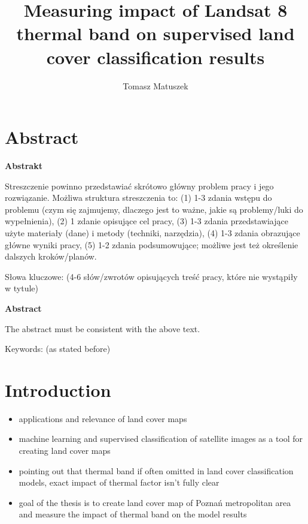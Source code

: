 \documentclass{amuthesis}
\author{Tomasz Matuszek}
\title{Measuring impact of Landsat 8 thermal band on supervised land
cover classification results}
\begin{document}

\titlepage


\hypertarget{abstract}{%
\chapter*{Abstract}\label{abstract}}

\textbf{Abstrakt}

Streszczenie powinno przedstawiać skrótowo główny problem pracy i jego
rozwiązanie. Możliwa struktura streszczenia to: (1) 1-3 zdania wstępu do
problemu (czym się zajmujemy, dlaczego jest to ważne, jakie są
problemy/luki do wypełnienia), (2) 1 zdanie opisujące cel pracy, (3) 1-3
zdania przedstawiające użyte materiały (dane) i metody (techniki,
narzędzia), (4) 1-3 zdania obrazujące główne wyniki pracy, (5) 1-2
zdania podsumowujące; możliwe jest też określenie dalszych
kroków/planów.

Słowa kluczowe: (4-6 słów/zwrotów opisujących treść pracy, które nie
wystąpiły w tytule)

\textbf{Abstract}

The abstract must be consistent with the above text.

Keywords: (as stated before)

\newpage

\sf\tighttoc\doublespacing


\hypertarget{sec-intro}{%
\chapter{Introduction}\label{sec-intro}}

\begin{itemize}
\item
  applications and relevance of land cover maps
\item
  machine learning and supervised classification of satellite images as
  a tool for creating land cover maps
\item
  pointing out that thermal band if often omitted in land cover
  classification models, exact impact of thermal factor isn't fully
  clear
\item
  goal of the thesis is to create land cover map of Poznań metropolitan
  area and measure the impact of thermal band on the model results
\end{itemize}
\end{document}
